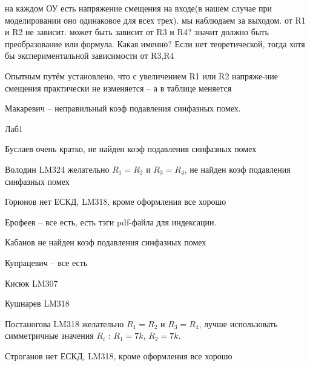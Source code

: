 \documentclass[a4paper,11pt]{article}
\begin{document}
на каждом ОУ есть напряжение смещения на входе(в нашем случае при моделировании оно одинаковое для всех трех). мы наблюдаем за выходом. от R1 и R2 не зависит. может быть зависит от R3 и R4? значит должно быть преобразование или формула.
Какая именно? Если нет теоретической, тогда хотя бы экспериментальной зависимости от R3,R4

Опытным путём установлено, что с увеличением R1 или R2 напряже-ние смещения практически не изменяется -- а в таблице меняется


Макаревич -- неправильный коэф подавления синфазных помех.

\newpage
Лаб1 

Буслаев  очень кратко, не найден коэф подавления синфазных помех

Володин LM324  желательно $R_1=R_2$ и $R_3=R_4$, не найден коэф подавления синфазных помех

Горюнов  нет ЕСКД, LM318, кроме оформления все хорошо

Ерофеев -- все есть, есть тэги pdf-файла для индексации.

Кабанов  не найден коэф подавления синфазных помех

Купрацевич -- все есть

Кисюк LM307

Кушнарев LM318

Постаногова LM318 желательно $R_1=R_2$ и $R_3=R_4$, лучше использовать симметричные значения $R_i$ : $R_1=7k$, $R_2=7k$. 

Строганов нет ЕСКД, LM318, кроме оформления все хорошо
\end{document}
